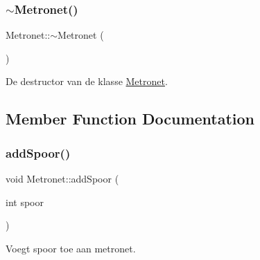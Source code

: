 \subsubsection{\texorpdfstring{$\sim$\+Metronet()}{~Metronet()}}
{\footnotesize\ttfamily Metronet\+::$\sim$\+Metronet (\begin{DoxyParamCaption}{ }\end{DoxyParamCaption})\hspace{0.3cm}{\ttfamily [virtual]}}



De destructor van de klasse \hyperlink{class_metronet}{Metronet}. 



\subsection{Member Function Documentation}
\mbox{\label{class_metronet_a0422381a8d7f32a915e0ad966af43627}} 
\subsubsection{\texorpdfstring{add\+Spoor()}{addSpoor()}}
{\footnotesize\ttfamily void Metronet\+::add\+Spoor (\begin{DoxyParamCaption}\item[{int}]{spoor }\end{DoxyParamCaption})}



Voegt spoor toe aan metronet. 


